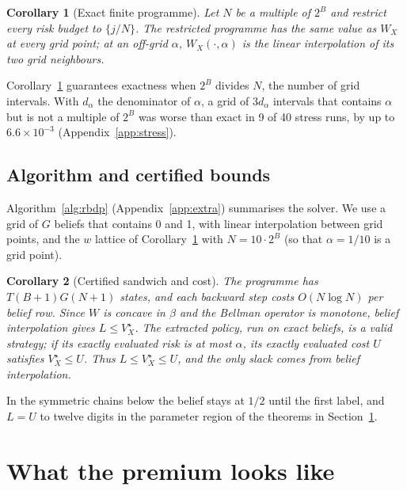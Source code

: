 \documentclass{article}
\theoremstyle{plain}
\newtheorem{corollary}{Corollary}
\theoremstyle{definition}
\theoremstyle{remark}
\begin{document}
\begin{corollary}[Exact finite programme]
\label{cor:finite}
Let $N$ be a multiple of $2^B$ and restrict every risk budget to $\{j/N\}$. The restricted programme has the same value as $W_X$ at every grid point; at an off-grid $\alpha$, $W_X(\cdot,\alpha)$ is the linear interpolation of its two grid neighbours.
\end{corollary}

Corollary~\ref{cor:finite} guarantees exactness when $2^B$ divides $N$, the number of grid intervals. With $d_\alpha$ the denominator of $\alpha$, a grid of $3d_\alpha$ intervals that contains $\alpha$ but is not a multiple of $2^B$ was worse than exact in 9 of 40 stress runs, by up to $6.6\times10^{-3}$ (Appendix~\ref{app:stress}).

\subsection{Algorithm and certified bounds}

Algorithm~\ref{alg:rbdp} (Appendix~\ref{app:extra}) summarises the solver. We use a grid of $G$ beliefs that contains 0 and 1, with linear interpolation between grid points, and the $w$ lattice of Corollary~\ref{cor:finite} with $N=10\cdot 2^B$ (so that $\alpha=1/10$ is a grid point).


\begin{corollary}[Certified sandwich and cost]
\label{cor:sandwich}
The programme has $T(B+1)G(N+1)$ states, and each backward step costs $O(N\log N)$ per belief row. Since $W$ is concave in $\beta$ and the Bellman operator is monotone, belief interpolation gives $L\le V^\star_X$. The extracted policy, run on exact beliefs, is a valid strategy; if its exactly evaluated risk is at most $\alpha$, its exactly evaluated cost $U$ satisfies $V^\star_X\le U$. Thus $L\le V^\star_X\le U$, and the only slack comes from belief interpolation.
\end{corollary}

In the symmetric chains below the belief stays at $1/2$ until the first label, and $L=U$ to twelve digits in the parameter region of the theorems in Section~\ref{sec:premium}.

\section{What the premium looks like}
\label{sec:premium}
\end{document}
